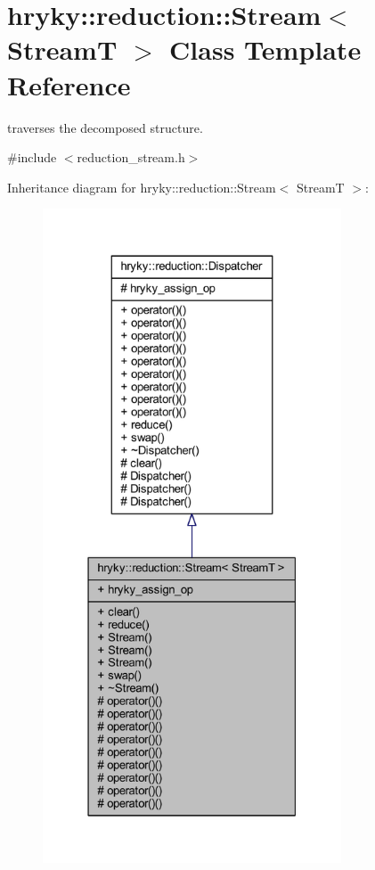 \hypertarget{classhryky_1_1reduction_1_1_stream}{\section{hryky\-:\-:reduction\-:\-:Stream$<$ Stream\-T $>$ Class Template Reference}
\label{classhryky_1_1reduction_1_1_stream}
}


traverses the decomposed structure.  




{\ttfamily \#include $<$reduction\-\_\-stream.\-h$>$}



Inheritance diagram for hryky\-:\-:reduction\-:\-:Stream$<$ Stream\-T $>$\-:
\nopagebreak
\begin{figure}[H]
\begin{center}
\leavevmode
\includegraphics[height=550pt]{classhryky_1_1reduction_1_1_stream__inherit__graph}
\end{center}
\end{figure}
